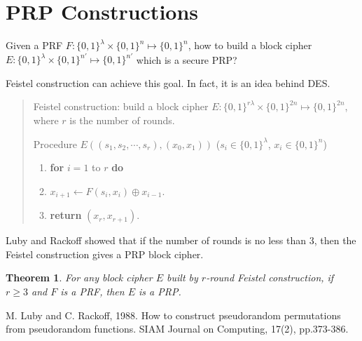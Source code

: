 \documentclass[12pt]{article}
\newcommand{\bits}{\{0,1\}}
\newcommand{\tab}{\hspace{0.3in}}
\newtheorem{theorem}{Theorem}[section]
\theoremstyle{definition}
\begin{document}
\section{PRP Constructions}
Given a PRF $F : \bits^\lambda \times \bits^n \mapsto \bits^n$, how to build a block cipher $E : \bits^\lambda \times \bits^{n'} \mapsto \bits^{n'}$ which is a secure PRP?

Feistel construction can achieve this goal. In fact, it is an idea behind DES.

\begin{quote}
Feistel construction: build a block cipher $E : \bits^{r\lambda} \times \bits^{2n} \mapsto \bits^{2n}$, where $r$ is the number of rounds.

Procedure $E((s_1, s_2, \cdots, s_r), (x_0, x_1))$ ($s_i\in\bits^\lambda$, $x_i\in\bits^n$)
\begin{enumerate}
\item {\bf for} $i=1$ to $r$ {\bf do}
\item \tab $x_{i+1} \gets F(s_i, x_i) \oplus x_{i-1}$.
\item {\bf return} $(x_r, x_{r+1})$.
\end{enumerate}
\end{quote}

Luby and Rackoff \cite{LR88} showed that if the number of rounds is no less than 3, then the Feistel construction gives a PRP block cipher.
\begin{theorem}
For any block cipher $E$ built by $r$-round Feistel construction, if $r\geq 3$ and $F$ is a PRF, then $E$ is a PRP.
\end{theorem}

\begin{thebibliography}{10}

M. Luby and C. Rackoff, 1988. 
How to construct pseudorandom permutations from pseudorandom functions. 
SIAM Journal on Computing, 17(2), pp.373-386.

\end{thebibliography}
\end{document}
